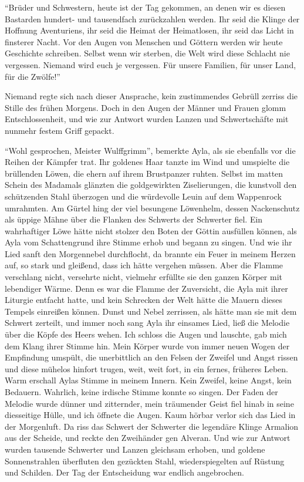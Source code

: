 ``Brüder und Schwestern, heute ist der Tag gekommen, an denen wir es diesen Bastarden hundert- und tausendfach zurückzahlen werden. Ihr seid die Klinge der Hoffnung Aventuriens, ihr seid die Heimat der Heimatlosen, ihr seid das Licht in finsterer Nacht. Vor den Augen von Menschen und Göttern werden wir heute Geschichte schreiben. Selbst wenn wir sterben, die Welt wird diese Schlacht nie vergessen. Niemand wird euch je vergessen. Für unsere Familien, für unser Land, für die Zwölfe!''

Niemand regte sich nach dieser Ansprache, kein zustimmendes Gebrüll zerriss die Stille des frühen Morgens. Doch in den Augen der Männer und Frauen glomm Entschlossenheit, und wie zur Antwort wurden Lanzen und Schwertschäfte mit nunmehr festem Griff gepackt.

``Wohl gesprochen, Meister Wulffgrimm'', bemerkte Ayla, als sie ebenfalls vor die Reihen der Kämpfer trat. Ihr goldenes Haar tanzte im Wind und umspielte die brüllenden Löwen, die ehern auf ihrem Brustpanzer ruhten. Selbst im matten Schein des Madamals glänzten die goldgewirkten Ziselierungen, die kunstvoll den schützenden Stahl überzogen und die würdevolle Leuin auf dem Wappenrock umrahmten. Am Gürtel hing der viel besungene Löwenhelm, dessen Nackenschutz als üppige Mähne über die Flanken des Schwerts der Schwerter fiel. Ein wahrhaftiger Löwe hätte nicht stolzer den Boten der Göttin ausfüllen können, als Ayla vom Schattengrund ihre Stimme erhob und begann zu singen. Und wie ihr Lied sanft den Morgennebel durchflocht, da brannte ein Feuer in meinem Herzen auf, so stark und gleißend, dass ich hätte vergehen müssen. Aber die Flamme verschlang nicht, versehrte nicht, vielmehr erfüllte sie den ganzen Körper mit lebendiger Wärme. Denn es war die Flamme der Zuversicht, die Ayla mit ihrer Liturgie entfacht hatte, und kein Schrecken der Welt hätte die Mauern dieses Tempels einreißen können. Dunst und Nebel zerrissen, als hätte man sie mit dem Schwert zerteilt, und immer noch sang Ayla ihr einsames Lied, ließ die Melodie über die Köpfe des Heers wehen. Ich schloss die Augen und lauschte, gab mich dem Klang ihrer Stimme hin. Mein Körper wurde von immer neuen Wogen der Empfindung umspült, die unerbittlich an den Felsen der Zweifel und Angst rissen und diese mühelos hinfort trugen, weit, weit fort, in ein fernes, früheres Leben. Warm erschall Aylas Stimme in meinem Innern. Kein Zweifel, keine Angst, kein Bedauern. Wahrlich, keine irdische Stimme konnte so singen. Der Faden der Melodie wurde dünner und zitternder, mein träumender Geist fiel hinab in seine diesseitige Hülle, und ich öffnete die Augen. Kaum hörbar verlor sich das Lied in der Morgenluft. Da riss das Schwert der Schwerter die legendäre Klinge Armalion aus der Scheide, und reckte den Zweihänder gen Alveran. Und wie zur Antwort wurden tausende Schwerter und Lanzen gleichsam erhoben, und goldene Sonnenstrahlen überfluten den gezückten Stahl, wiederspiegelten auf Rüstung und Schilden. Der Tag der Entscheidung war endlich angebrochen.

